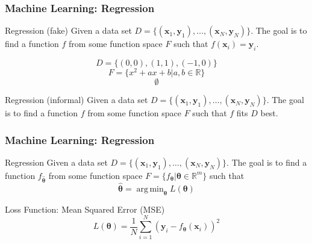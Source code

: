 \documentclass{beamer}
\DeclareMathOperator*{\argmin}{arg\,min}
\begin{document}
\begin{frame}
    \frametitle{Machine Learning: Regression}

    \begin{block}{Regression (fake)}
        Given a data set $D = \{(\boldsymbol{x}_1, \boldsymbol{y}_1), \dots, (\boldsymbol{x}_N, \boldsymbol{y}_N)\}$. The goal is to find a function $f$ from some function space $F$ such that $f(\boldsymbol{x}_i) = \boldsymbol{y}_i$.
    \end{block}

    \begin{example}
        \[D = \{(0, 0), (1, 1), (-1, 0)\}\]
        \[F = \{x^2 + ax + b \vert a, b \in \mathbb{R}\}\]
        \[\emptyset\]
    \end{example}

    \begin{block}{Regression (informal)}
        Given a data set $D = \{(\boldsymbol{x}_1, \boldsymbol{y}_1), \dots, (\boldsymbol{x}_N, \boldsymbol{y}_N)\}$. The goal is to find a function $f$ from some function space $F$ such that $f$ fits $D$ best.
    \end{block}
\end{frame}

\begin{frame}
    \frametitle{Machine Learning: Regression}

    \begin{block}{Regression}
        Given a data set $D = \{(\boldsymbol{x}_1, \boldsymbol{y}_1), \dots, (\boldsymbol{x}_N, \boldsymbol{y}_N)\}$. The goal is to find a function $f_{\hat{\boldsymbol{\theta}}}$ from some function space $F = \{f_{\boldsymbol{\theta}} \vert \boldsymbol{\theta} \in \mathbb{R}^m\}$ such that
        \[\hat{\boldsymbol{\theta}} = \argmin_{\boldsymbol{\theta}} L(\boldsymbol{\theta})\]
    \end{block}
    
    \begin{block}{Loss Function: Mean Squared Error (MSE)}
        \[L(\boldsymbol{\theta}) = \frac{1}{N}\sum_{i = 1}^{N} (\boldsymbol{y}_i - f_{\boldsymbol{\theta}}(\boldsymbol{x}_i))^2\]
    \end{block}

\end{frame}
\end{document}
